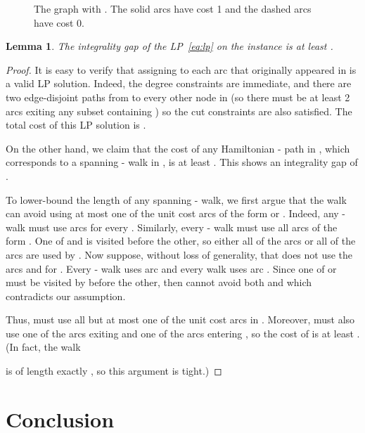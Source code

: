 \documentclass[11pt]{article}
\newtheorem{lemma}[theorem]{Lemma}
\theoremstyle{definition}
\begin{document}
\begin{figure}
 \centering
{}
  \caption{The graph  with . The solid arcs have cost 1 and
    the dashed arcs have cost 0.}\label{fig:gap}
\end{figure}

\begin{lemma} \label{lem:intgap}
  The integrality gap of the LP~\ref{eq:lp} on the instance  is
  at least .
\end{lemma}

\begin{proof}
  It is easy to verify that assigning  to each arc that originally
  appeared in  is a valid LP solution. Indeed, the degree constraints are immediate,
  and there are two edge-disjoint paths from  to every other node in
   (so there must be at least 2 arcs exiting any subset containing )
  so the cut constraints are also satisfied. The total cost of
  this LP solution is .

  On the other hand, we claim that the cost of any Hamiltonian -
  path in , which corresponds to a spanning - walk  in
  , is at least . This shows an integrality gap of
  .

  To lower-bound the length of any spanning - walk, we first argue
  that the walk  can avoid using at most one of the unit cost arcs
  of the form  or . Indeed, any - walk
  must use arcs  for every . Similarly, every
  - walk must use all arcs of the form . One of
   and  is visited before the other, so either all of the
   arcs or all of the  arcs are used by
  . Now suppose, without loss of generality, that  does not use
  the arcs  and  for .  Every
  - walk uses arc  and every 
  walk uses arc . Since one of  or  must be
  visited by  before the other, then  cannot avoid both
   and  which contradicts our assumption.

  Thus,  must use all but at most one of the  unit cost arcs
  in . Moreover,  must also use one of the arcs exiting  and one
  of the arcs entering , so the cost of  is at least .
  (In fact, the walk

 is of length exactly , so this argument is tight.)
\end{proof}


\section{Conclusion}
\end{document}
